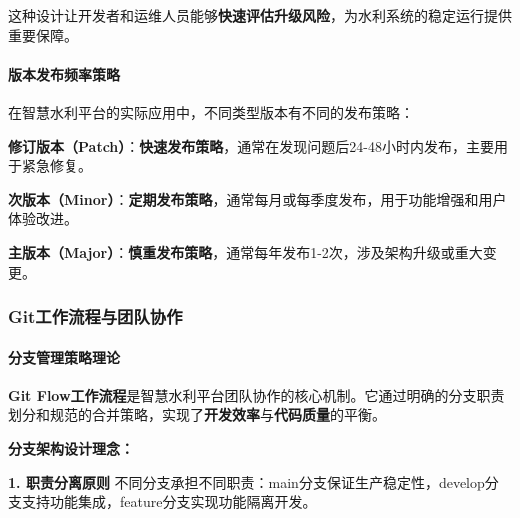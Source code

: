 这种设计让开发者和运维人员能够\textbf{快速评估升级风险}，为水利系统的稳定运行提供重要保障。

\paragraph{版本发布频率策略}\label{ux7248ux672cux53d1ux5e03ux9891ux7387ux7b56ux7565}

在智慧水利平台的实际应用中，不同类型版本有不同的发布策略：

\textbf{修订版本（Patch）}：\textbf{快速发布策略}，通常在发现问题后24-48小时内发布，主要用于紧急修复。

\textbf{次版本（Minor）}：\textbf{定期发布策略}，通常每月或每季度发布，用于功能增强和用户体验改进。

\textbf{主版本（Major）}：\textbf{慎重发布策略}，通常每年发布1-2次，涉及架构升级或重大变更。

\begin{Shaded}
\begin{Highlighting}[]
\OperatorTok{=}\NormalTok{ \{}
  \OperatorTok{:} \OperatorTok{,}
  \OperatorTok{:} \OperatorTok{,}    
  \OperatorTok{:} \OperatorTok{,}    
  \OperatorTok{:}      
\NormalTok{\}}
\end{Highlighting}
\end{Shaded}

\subsubsection{Git工作流程与团队协作}\label{gitux5de5ux4f5cux6d41ux7a0bux4e0eux56e2ux961fux534fux4f5c}

\paragraph{分支管理策略理论}\label{ux5206ux652fux7ba1ux7406ux7b56ux7565ux7406ux8bba}

\textbf{Git Flow工作流程}是智慧水利平台团队协作的核心机制。它通过明确的分支职责划分和规范的合并策略，实现了\textbf{开发效率}与\textbf{代码质量}的平衡。

\textbf{分支架构设计理念：}

\textbf{1. 职责分离原则} 不同分支承担不同职责：main分支保证生产稳定性，develop分支支持功能集成，feature分支实现功能隔离开发。

